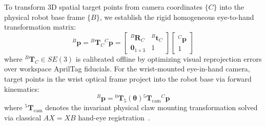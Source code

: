 \documentclass[journal]{IEEEtran}
\begin{document}
To transform 3D spatial target points from camera coordinates $\{C\}$ into the physical robot base frame $\{B\}$, we establish the rigid homogeneous eye-to-hand transformation matrix:
\begin{equation}
\label{eq:hand_eye_transform}
{}^B\mathbf{p} = {}^B\mathbf{T}_C {}^C\mathbf{p} = \begin{bmatrix} {}^B\mathbf{R}_C & {}^B\mathbf{t}_C \\ \mathbf{0}_{1 \times 3} & 1 \end{bmatrix} \begin{bmatrix} {}^C\mathbf{p} \\ 1 \end{bmatrix}
\end{equation}
where ${}^B\mathbf{T}_C \in SE(3)$ is calibrated offline by optimizing visual reprojection errors over workspace AprilTag fiducials. For the wrist-mounted eye-in-hand camera, target points in the wrist optical frame project into the robot base via forward kinematics:
\begin{equation}
\label{eq:eye_in_hand_transform}
{}^B\mathbf{p} = {}^0\mathbf{T}_5(\boldsymbol{\theta}) {}^5\mathbf{T}_{\text{cam}} {}^C\mathbf{p}
\end{equation}
where ${}^5\mathbf{T}_{\text{cam}}$ denotes the invariant physical claw mounting transformation solved via classical $AX=XB$ hand-eye registration~\cite{chaumette2006visual}.
\end{document}
